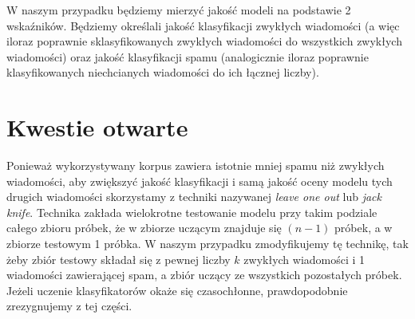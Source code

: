 \documentclass[a4paper,12pt]{article}
\begin{document}
W naszym przypadku będziemy mierzyć jakość modeli na podstawie 2 wskaźników. Będziemy określali jakość klasyfikacji zwykłych wiadomości (a więc iloraz poprawnie sklasyfikowanych zwykłych wiadomości do wszystkich zwykłych wiadomości) oraz jakość klasyfikacji spamu (analogicznie iloraz poprawnie klasyfikowanych niechcianych wiadomości do ich łącznej liczby).\\

\section{Kwestie otwarte}

Ponieważ wykorzystywany korpus zawiera istotnie mniej spamu niż zwykłych wiadomości, aby zwiększyć jakość klasyfikacji i samą jakość oceny modelu tych drugich wiadomości skorzystamy z techniki nazywanej \textit{leave one out} lub \textit{jack knife}. Technika zakłada wielokrotne testowanie modelu przy takim podziale całego
zbioru próbek, że w zbiorze uczącym znajduje się $(n-1)$ próbek, a w zbiorze testowym 1 próbka. W naszym przypadku zmodyfikujemy tę technikę, tak żeby zbiór testowy składał się z pewnej liczby $k$ zwykłych wiadomości i 1 wiadomości zawierającej spam, a zbiór uczący ze wszystkich pozostałych próbek. Jeżeli uczenie klasyfikatorów okaże się czasochłonne, prawdopodobnie zrezygnujemy z tej części.
\end{document}
